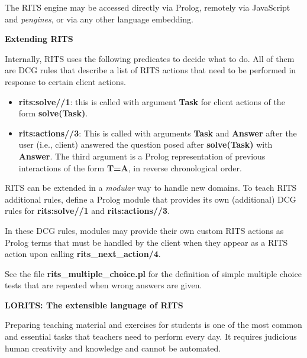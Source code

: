 \documentclass[a4paper,11pt]{article}
\begin{document}
The RITS engine may be accessed directly via Prolog, remotely via
JavaScript and \textit{pengines}, or via any other language embedding.

\bigskip
\begin{center}
  \large\textbf{Extending RITS}
\end{center}

\medskip
\noindent Internally, RITS uses the following predicates to decide
what to do. All of them are DCG rules that describe a list of RITS
actions that need to be performed in response to certain client actions.

\begin{itemize}
\item \textbf{rits:solve//1}: this is called with argument \textbf{Task}
  for client actions of the form \textbf{solve(Task)}.

\item \textbf{rits:actions//3}: This is called with arguments
  \textbf{Task} and \textbf{Answer} after the user (i.e., client)
  answered the question posed after \textbf{solve(Task)} with
  \textbf{Answer}. The third argument is a Prolog representation of
  previous interactions of the form \textbf{T=A}, in reverse
  chronological order.

\end{itemize}

RITS can be extended in a \textit{modular} way to handle new domains.
To teach RITS additional rules, define a Prolog module that provides
its own (additional) DCG rules for \textbf{rits:solve//1} and
\textbf{rits:actions//3}. 

In these DCG rules, modules may provide their own custom RITS actions
as Prolog terms that must be handled by the client when they appear as
a RITS action upon calling \textbf{rits\_next\_action/4}.

See the file \textbf{rits\_multiple\_choice.pl} for the definition of
simple multiple choice tests that are repeated when wrong answers are
given.

\pagebreak

\begin{center}
  \large\textbf{LORITS: The extensible language of RITS}
\end{center}

\medskip
\noindent
Preparing teaching material and exercises for students is one of the
most common and essential tasks that teachers need to perform
every day. It requires judicious human creativity and knowledge and
cannot be automated.
\end{document}
